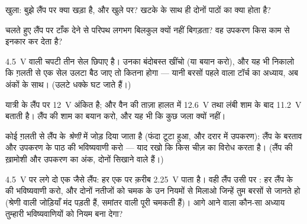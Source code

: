 \begin{exercise}[$\star$]\label{exo:g8:voltage-voltmeter:7}
 खुला: बुझे लैंप पर क्या खड़ा है, और खुले  पर? खटके के साथ
ही दोनों पाठों का क्या होता है?
\end{exercise}

\begin{exercise}[$\star$]\label{exo:g8:voltage-voltmeter:8}
चलते हुए लैंप पर  टाँक देने से परिपथ लगभग बिलकुल क्यों नहीं
बिगड़ता? वह उपकरण किस काम से इनकार कर देता है?
\end{exercise}

\begin{exercise}[$\star\star$]\label{exo:g8:voltage-voltmeter:9}
\qty{4.5}{V} वाली चपटी  तीन सेल छिपाए है। उनका बंदोबस्त खींचो
(या बयान करो), और यह भी निकालो कि ग़लती से एक सेल उलटा बैठ जाए तो
 कितना होगा --- यानी बरसों पहले वाला टॉर्च का अध्याय, अब अंकों
के साथ। (उलटे धक्के घट जाते हैं।)
\end{exercise}

\begin{exercise}[$\star\star$]\label{exo:g8:voltage-voltmeter:10}
यात्री के लैंप पर \qty{12}{V} अंकित है; और वैन की  ताज़ा हालत
में \qty{12.6}{V} तथा लंबी शाम के बाद \qty{11.2}{V} बताती है। लैंप की
शाम का बयान करो, और यह भी कि कुछ जला क्यों नहीं।
\end{exercise}

\begin{exercise}[$\star\star$]\label{exo:g8:voltage-voltmeter:11}
कोई  ग़लती से लैंप के \emph{श्रेणी} में जोड़ दिया जाता है
(फंदा टूटा हुआ, और दरार में उपकरण): लैंप के बरताव और उपकरण के पाठ की
भविष्यवाणी करो --- याद रखो कि  किस चीज़ का विरोध करता है।
(लैंप की ख़ामोशी और उपकरण का अंक, दोनों सिखाने वाले हैं।)
\end{exercise}

\begin{exercise}[$\star\star\star$]\label{exo:g8:voltage-voltmeter:12}
\qty{4.5}{V} पर  लगे दो एक जैसे लैंप:  हर एक पर
क़रीब \qty{2.25}{V} पाता है। वही लैंप उसी  पर :
हर लैंप के  की भविष्यवाणी करो, और दोनों नतीजों को चमक के उन
नियमों से मिलाओ जिन्हें तुम बरसों से जानते हो (श्रेणी वाली जोड़ियाँ मंद
पड़ती हैं, समांतर वाली पूरी चमकती हैं)। आगे आने वाला कौन-सा अध्याय
तुम्हारी भविष्यवाणियों को नियम बना देगा?
\end{exercise}

